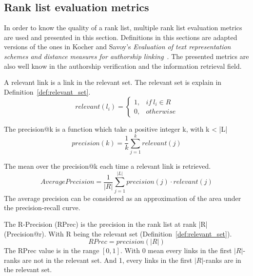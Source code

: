 \subsection{Rank list evaluation metrics \label{sec:rl_eval}}

In order to know the quality of a rank list, multiple rank list evaluation metrics are used and presented in this section.
Definitions in this sections are adapted versions of the ones in Kocher and Savoy's \textit{Evaluation of text representation schemes and distance measures for authorship linking}~\cite{kocher_linking}.
The presented metrics are also well know in the authorship verification and the information retrieval field.

\begin{definition}
  A relevant link is a link in the relevant set.
  The relevant set is explain in Definition~\ref{def:relevant_set}.
  \begin{equation}
    relevant(l_i) =
    \begin{cases}
      1, & if\ l_i \in R \\
      0, & otherwise
    \end{cases}
  \end{equation}
\end{definition}

\begin{definition}
  The precision@k is a function which take a positive integer k, with k < |L|
  \begin{equation}
    precision(k) = \frac{1}{k} \sum_{j=1}^{k} relevant(j)
  \end{equation}
\end{definition}

\begin{definition}
  The mean over the precision@k each time a relevant link is retrieved.
  \begin{equation}
    AveragePrecision = \frac{1}{|R|} \sum_{j=1}^{|L|} precision(j) \cdot relevant(j)
  \end{equation}
  The average precision can be considered as an approximation of the area under the precision-recall curve.
\end{definition}

\begin{definition}
  The R-Precision (RPrec) is the precision in the rank list at rank |R| (Precision@r).
  With R being the relevant set (Definition~\ref{def:relevant_set}).
  \begin{equation}
    RPrec = precision(|R|)
  \end{equation}
  The RPrec value is in the range $\left[0, 1\right]$.
  With 0 mean every links in the first $|R|$-ranks are not in the relevant set.
  And 1, every links in the first $|R|$-ranks are in the relevant set.
\end{definition}

